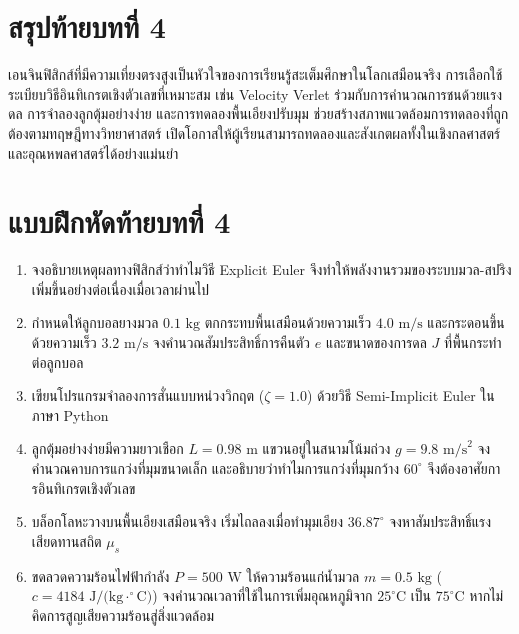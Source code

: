 \clearpage

\section*{สรุปท้ายบทที่ 4}

เอนจินฟิสิกส์ที่มีความเที่ยงตรงสูงเป็นหัวใจของการเรียนรู้สะเต็มศึกษาในโลกเสมือนจริง การเลือกใช้ระเบียบวิธีอินทิเกรตเชิงตัวเลขที่เหมาะสม เช่น Velocity Verlet ร่วมกับการคำนวณการชนด้วยแรงดล การจำลองลูกตุ้มอย่างง่าย และการทดลองพื้นเอียงปรับมุม ช่วยสร้างสภาพแวดล้อมการทดลองที่ถูกต้องตามทฤษฎีทางวิทยาศาสตร์ เปิดโอกาสให้ผู้เรียนสามารถทดลองและสังเกตผลทั้งในเชิงกลศาสตร์และอุณหพลศาสตร์ได้อย่างแม่นยำ

\clearpage

\section*{แบบฝึกหัดท้ายบทที่ 4}

\begin{enumerate}
    \item จงอธิบายเหตุผลทางฟิสิกส์ว่าทำไมวิธี Explicit Euler จึงทำให้พลังงานรวมของระบบมวล-สปริงเพิ่มขึ้นอย่างต่อเนื่องเมื่อเวลาผ่านไป
    \item กำหนดให้ลูกบอลยางมวล $0.1\text{ kg}$ ตกกระทบพื้นเสมือนด้วยความเร็ว $4.0\text{ m/s}$ และกระดอนขึ้นด้วยความเร็ว $3.2\text{ m/s}$ จงคำนวณสัมประสิทธิ์การคืนตัว $e$ และขนาดของการดล $J$ ที่พื้นกระทำต่อลูกบอล
    \item เขียนโปรแกรมจำลองการสั่นแบบหน่วงวิกฤต ($\zeta = 1.0$) ด้วยวิธี Semi-Implicit Euler ในภาษา Python
    \item ลูกตุ้มอย่างง่ายมีความยาวเชือก $L = 0.98\text{ m}$ แขวนอยู่ในสนามโน้มถ่วง $g = 9.8\text{ m/s}^2$ จงคำนวณคาบการแกว่งที่มุมขนาดเล็ก และอธิบายว่าทำไมการแกว่งที่มุมกว้าง $60^\circ$ จึงต้องอาศัยการอินทิเกรตเชิงตัวเลข
    \item บล็อกโลหะวางบนพื้นเอียงเสมือนจริง เริ่มไถลลงเมื่อทำมุมเอียง $36.87^\circ$ จงหาสัมประสิทธิ์แรงเสียดทานสถิต $\mu_s$
    \item ขดลวดความร้อนไฟฟ้ากำลัง $P = 500\text{ W}$ ให้ความร้อนแก่น้ำมวล $m = 0.5\text{ kg}$ ($c = 4184\text{ J/(kg}\cdot^\circ\text{C)}$) จงคำนวณเวลาที่ใช้ในการเพิ่มอุณหภูมิจาก $25^\circ\text{C}$ เป็น $75^\circ\text{C}$ หากไม่คิดการสูญเสียความร้อนสู่สิ่งแวดล้อม
\end{enumerate}
